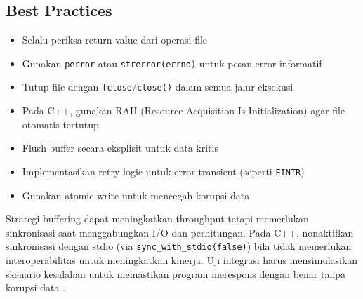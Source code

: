 \documentclass[../main.tex]{subfiles}
\begin{document}
\subsection{Best Practices}
\begin{itemize}
  \item Selalu periksa return value dari operasi file
  \item Gunakan \texttt{perror} atau \texttt{strerror(errno)} untuk pesan error informatif
  \item Tutup file dengan \texttt{fclose}/\texttt{close()} dalam semua jalur eksekusi
  \item Pada C++, gunakan RAII (Resource Acquisition Is Initialization) agar file otomatis tertutup
  \item Flush buffer secara eksplisit untuk data kritis
  \item Implementasikan retry logic untuk error transient (seperti \texttt{EINTR})
  \item Gunakan atomic write untuk mencegah korupsi data
\end{itemize}

Strategi buffering dapat meningkatkan throughput tetapi memerlukan sinkronisasi saat menggabungkan I/O dan perhitungan. Pada C++, nonaktifkan sinkronisasi dengan stdio (via \texttt{sync\_with\_stdio(false)}) bila tidak memerlukan interoperabilitas untuk meningkatkan kinerja. Uji integrasi harus mensimulasikan skenario kesalahan untuk memastikan program merespons dengan benar tanpa korupsi data \parencite{cplusplus-io,cpp-reference}.
\end{document}
